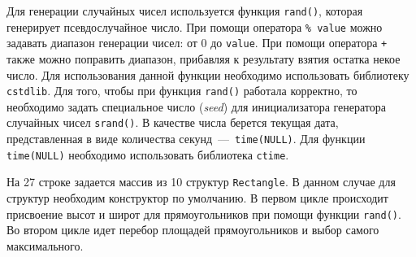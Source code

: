 Для генерации случайных чисел используется функция \lstinline|rand()|, которая генерирует псевдослучайное число. При помощи оператора \lstinline|% value| можно задавать диапазон генерации чисел: от 0 до \lstinline|value|. При помощи оператора \lstinline|+| также можно поправить диапазон, прибавляя к результату взятия остатка некое число. Для использования данной функции необходимо использовать библиотеку \lstinline|cstdlib|. Для того, чтобы при функция \lstinline|rand()| работала корректно, то необходимо задать специальное число (\emph{seed}) для инициализатора генератора случайных чисел \lstinline|srand()|. В качестве числа берется текущая дата, представленная в виде количества секунд~---~\lstinline|time(NULL)|. Для функции \lstinline|time(NULL)| необходимо использовать библиотека \lstinline|ctime|.

На 27 строке задается массив из 10 структур \lstinline|Rectangle|. В данном случае для структур необходим конструктор по умолчанию. В первом цикле происходит присвоение высот и широт для прямоугольников при помощи функции \lstinline|rand()|. Во втором цикле идет перебор площадей прямоугольников и выбор самого максимального.  
